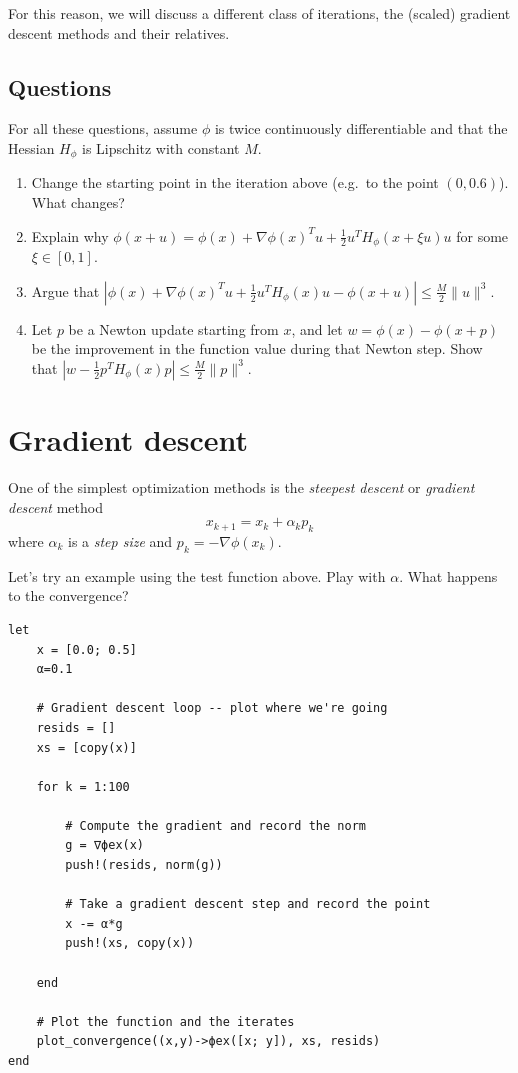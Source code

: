 \documentclass[12pt, leqno]{article} %
\providecommand{\tightlist}{%
  \setlength{\itemsep}{0pt}\setlength{\parskip}{0pt}}
\begin{document}
For this reason, we will discuss a different class of iterations, the
(scaled) gradient descent methods and their relatives.

\subsection{Questions}

For all these questions, assume \(\phi\) is twice continuously
differentiable and that the Hessian \(H_{\phi}\) is Lipschitz with
constant \(M\).

\begin{enumerate}
\def\labelenumi{\arabic{enumi}.}
\tightlist
\item
  Change the starting point in the iteration above (e.g.~to the point
  \((0, 0.6)\)). What changes?
\item
  Explain why
  \(\phi(x+u) = \phi(x) + \nabla \phi(x)^T u + \frac{1}{2} u^T H_{\phi}(x+\xi u) u\)
  for some \(\xi \in [0,1]\).
\item
  Argue that
  \(|\phi(x) + \nabla \phi(x)^T u + \frac{1}{2} u^T H_{\phi}(x) u - \phi(x+u)| \leq \frac{M}{2} \|u\|^3\).
\item
  Let \(p\) be a Newton update starting from \(x\), and let
  \(w = \phi(x)-\phi(x+p)\) be the improvement in the function value
  during that Newton step. Show that
  \(\left| w-\frac{1}{2} p^T H_{\phi}(x) p \right| \leq \frac{M}{2} \|p\|^3\).
\end{enumerate}

\section{Gradient descent}

One of the simplest optimization methods is the \emph{steepest descent}
or \emph{gradient descent} method \[x_{k+1} = x_k + \alpha_k p_k\] where
\(\alpha_k\) is a \emph{step size} and \(p_k = -\nabla \phi(x_k)\).

Let's try an example using the test function above. Play with
\(\alpha\). What happens to the convergence?

\begin{verbatim}
let
    x = [0.0; 0.5]
    α=0.1

    # Gradient descent loop -- plot where we're going
    resids = []
    xs = [copy(x)]

    for k = 1:100

        # Compute the gradient and record the norm
        g = ∇ϕex(x)
        push!(resids, norm(g))

        # Take a gradient descent step and record the point
        x -= α*g
        push!(xs, copy(x))

    end

    # Plot the function and the iterates
    plot_convergence((x,y)->ϕex([x; y]), xs, resids)
end
\end{verbatim}
\end{document}
